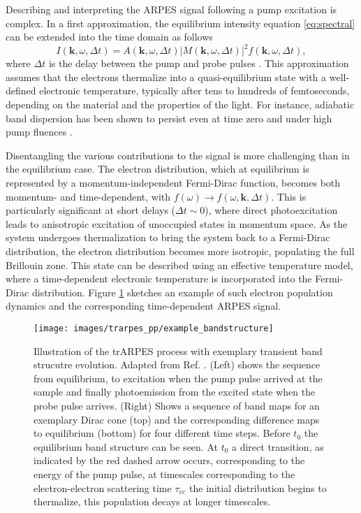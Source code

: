 Describing and interpreting the ARPES signal following a pump excitation is complex.
In a first approximation, the equilibrium intensity equation \ref{eq:spectral} can be extended into the time domain as follows
\begin{equation}
	I(\mathbf{k}, \omega, \Delta t) = A(\mathbf{k}, \omega, \Delta t)\left|M(\mathbf{k}, \omega, \Delta t)\right|^2f(\mathbf{k}, \omega, \Delta t),
\end{equation}
where $\Delta t$ is the delay between the pump and probe pulses \cite{freericks_what_2021}.
This approximation assumes that the electrons thermalize into a quasi-equilibrium state with a well-defined electronic temperature, typically after tens to hundreds of femtoseconds, depending on the material and the properties of the light.
For instance, adiabatic band dispersion has been shown to persist even at time zero and under high pump fluences \cite{boschini_time-resolved_2024,neufeld_time-_2022}.

Disentangling the various contributions to the signal is more challenging than in the equilibrium case.
The electron distribution, which at equilibrium is represented by a momentum-independent Fermi-Dirac function, becomes both momentum- and time-dependent, with $f(\omega) \rightarrow f(\omega, \mathbf{k}, \Delta t)$.
This is particularly significant at short delays ($\Delta t \sim 0$), where direct photoexcitation leads to anisotropic excitation of unoccupied states in momentum space.
As the system undergoes thermalization to bring the system back to a Fermi-Dirac distribution, the electron distribution becomes more isotropic, populating the full Brillouin zone.
This state can be described using an effective temperature model, where a time-dependent electronic temperature is incorporated into the Fermi-Dirac distribution.
Figure \ref{fig:example_bandstructure} sketches an example of such electron population dynamics and the corresponding time-dependent ARPES signal.

\begin{figure}
	\centering
	\texttt{[image: images/trarpes\_pp/example\_bandstructure]}
	\caption{Illustration of the trARPES process with exemplary transient band strucutre evolution. Adapted from Ref. \cite{boschini_time-resolved_2024}. (Left) shows the sequence from equilibrium, to excitation when the pump pulse arrived at the sample and finally photoemission from the excited state when the probe pulse arrives. (Right) Shows a sequence of band maps for an exemplary Dirac cone (top) and the corresponding difference maps to equilibrium (bottom) for four different time steps. Before $t_0$ the equilibrium band structure can be seen. At $t_0$ a direct transition, as indicated by the red dashed arrow occurs, corresponding to the energy of the pump pulse, at timescales corresponding to the electron-electron scattering time $\tau_{ee}$ the initial distribution begins to thermalize, this population decays at longer timescales.}
	\label{fig:example_bandstructure}
\end{figure}

